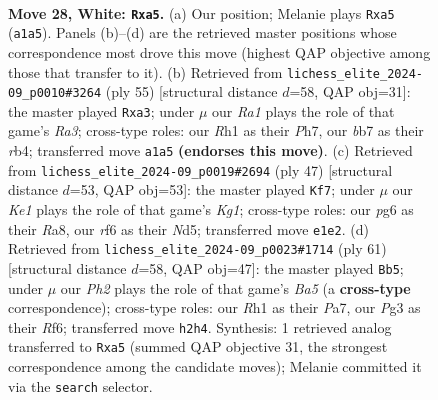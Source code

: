\documentclass[11pt]{article}
\begin{document}
\begin{figure}[p]
\label{fig:thought-m52}
\end{figure}

\clearpage

\begin{figure}[p]\centering
\begin{subfigure}{0.46\textwidth}\centering
\resizebox{\linewidth}{!}{%
\newchessgame
\chessboard[
  setfen={7k/1b1n1p1p/5rp1/pp1Pp3/4P3/1r3PP1/7P/R3K1NR w - - 0 28},
  showmover=false,
  pgfstyle=straightmove, color=movearrow, markmove={a1-a5}
]}
\caption{}
\end{subfigure}\hfill
\begin{subfigure}{0.46\textwidth}\centering
\resizebox{\linewidth}{!}{%
\newchessgame
\chessboard[
  setfen={3r4/1p2n1pp/r2k1p2/1p1p4/1R5P/Pp2PB2/5PP1/2R3K1 b - - 3 28},
  showmover=false,
  pgfstyle=straightmove, color=movearrow, markmove={a6-a3}
]}
\caption{}
\end{subfigure}
\\[4pt]
\begin{subfigure}{0.46\textwidth}\centering
\resizebox{\linewidth}{!}{%
\newchessgame
\chessboard[
  setfen={r5k1/pp2r3/2p2p1p/3n2p1/3P2P1/P3PN2/2R2PP1/1R4K1 b - - 0 24},
  showmover=false,
  pgfstyle=straightmove, color=movearrow, markmove={g8-f7}
]}
\caption{}
\end{subfigure}\hfill
\begin{subfigure}{0.46\textwidth}\centering
\resizebox{\linewidth}{!}{%
\newchessgame
\chessboard[
  setfen={2r3k1/pp6/3p1r2/3P1p2/bP3Pp1/P2RNpP1/7P/5R1K b - - 3 31},
  showmover=false,
  pgfstyle=straightmove, color=movearrow, markmove={a4-b5}
]}
\caption{}
\end{subfigure}
\caption{\textbf{Move 28, White: \texttt{Rxa5}.} (a) Our position; Melanie plays \texttt{Rxa5} (\texttt{a1a5}). Panels (b)--(d) are the retrieved master positions whose correspondence most drove this move (highest QAP objective among those that transfer to it). (b) Retrieved from \texttt{lichess\_elite\_2024-09\_p0010\#3264} (ply 55) [structural distance $d$=58, QAP obj=31]: the master played \texttt{Rxa3}; under $\mu$ our \emph{Ra1} plays the role of that game's \emph{Ra3}; cross-type roles: our \emph{R}h1 as their \emph{P}h7, our \emph{b}b7 as their \emph{r}b4; transferred move \texttt{a1a5} \textbf{(endorses this move)}. (c) Retrieved from \texttt{lichess\_elite\_2024-09\_p0019\#2694} (ply 47) [structural distance $d$=53, QAP obj=53]: the master played \texttt{Kf7}; under $\mu$ our \emph{Ke1} plays the role of that game's \emph{Kg1}; cross-type roles: our \emph{p}g6 as their \emph{R}a8, our \emph{r}f6 as their \emph{N}d5; transferred move \texttt{e1e2}. (d) Retrieved from \texttt{lichess\_elite\_2024-09\_p0023\#1714} (ply 61) [structural distance $d$=58, QAP obj=47]: the master played \texttt{Bb5}; under $\mu$ our \emph{Ph2} plays the role of that game's \emph{Ba5} (a \textbf{cross-type} correspondence); cross-type roles: our \emph{R}h1 as their \emph{P}a7, our \emph{P}g3 as their \emph{R}f6; transferred move \texttt{h2h4}. Synthesis: 1 retrieved analog transferred to \texttt{Rxa5} (summed QAP objective 31, the strongest correspondence among the candidate moves); Melanie committed it via the \texttt{search} selector.}

\end{figure}
\end{document}
